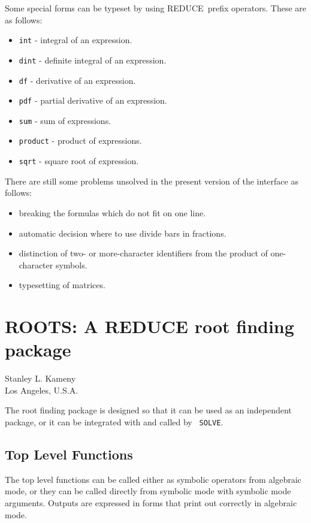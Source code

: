 \documentclass[11pt,letterpaper]{book}
\makeatletter
\newcommand{\REDUCE}{REDUCE}
\newcommand{\underscore}{\_}
\newcommand{\ttindex}[1]{{\renewcommand{\_}{\protect\underscore}%
                          \index{#1@{\tt #1}}}}
\makeatother
\begin{document}
Some special forms can be typeset by using \REDUCE\ prefix operators.
These are as follows:
\begin{itemize}
\item {\tt int} - integral of an expression.
\item {\tt dint} - definite integral of an expression.
\item {\tt df} - derivative of an expression.
\item {\tt pdf} - partial derivative of an expression.
\item {\tt sum} - sum of expressions.
\item {\tt product} - product of expressions.
\item {\tt sqrt} - square root of expression.
\end{itemize}
There are still some problems unsolved in the present version of the
interface as follows:
\begin{itemize}
\item breaking the formulas which do not fit on one line.
\item automatic decision where to use divide bars in fractions.
\item distinction of two- or more-character identifiers from the product
  of one-character symbols.
\item typesetting of matrices.
\end{itemize}

\chapter{ROOTS: A REDUCE root finding package}
\label{ROOTS}

{\footnotesize
\begin{center}
Stanley L. Kameny \\
Los Angeles, U.S.A.
\end{center}
}
\ttindex{ROOTS}

The root finding package is designed so that it can be used as an
independent package, or it can be integrated with and called by {\tt
SOLVE}.

\section{Top Level Functions}

The top level functions can be called either as symbolic operators from
algebraic mode, or they can be called directly from symbolic mode with
symbolic mode arguments.  Outputs are expressed in forms that print out
correctly in algebraic mode.
\end{document}
